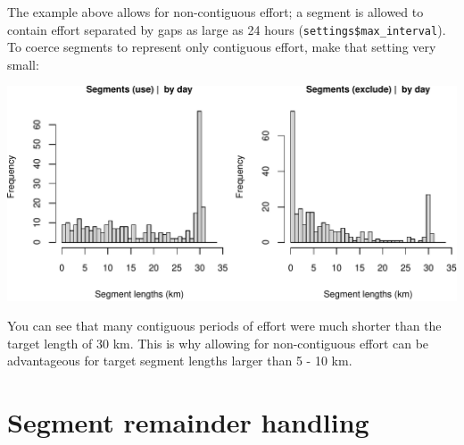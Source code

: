 \documentclass[
]{book}
\newenvironment{Shaded}{\begin{snugshade}}{\end{snugshade}}
\newcommand{\CommentTok}[1]{\textcolor[rgb]{0.56,0.35,0.01}{\textit{#1}}}
\newcommand{\DataTypeTok}[1]{\textcolor[rgb]{0.13,0.29,0.53}{#1}}
\newcommand{\DecValTok}[1]{\textcolor[rgb]{0.00,0.00,0.81}{#1}}
\newcommand{\FloatTok}[1]{\textcolor[rgb]{0.00,0.00,0.81}{#1}}
\newcommand{\KeywordTok}[1]{\textcolor[rgb]{0.13,0.29,0.53}{\textbf{#1}}}
\newcommand{\NormalTok}[1]{#1}
\newcommand{\OperatorTok}[1]{\textcolor[rgb]{0.81,0.36,0.00}{\textbf{#1}}}
\newcommand{\OtherTok}[1]{\textcolor[rgb]{0.56,0.35,0.01}{#1}}
\newcommand{\StringTok}[1]{\textcolor[rgb]{0.31,0.60,0.02}{#1}}
\begin{document}
The example above allows for non-contiguous effort; a segment is allowed to contain effort separated by gaps as large as 24 hours (\texttt{settings\$max\_interval}). To coerce segments to represent only contiguous effort, make that setting very small:

\begin{Shaded}
\end{Shaded}

\includegraphics{figures/unnamed-chunk-379-1.pdf}

You can see that many contiguous periods of effort were much shorter than the target length of 30 km. This is why allowing for non-contiguous effort can be advantageous for target segment lengths larger than 5 - 10 km.

\hypertarget{segment-remainder-handling}{%
\section*{Segment remainder handling}\label{segment-remainder-handling}}
\end{document}
